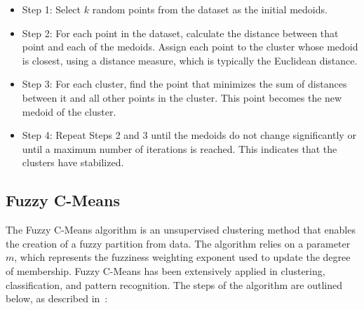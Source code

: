 \documentclass[a4paper,fleqn]{cas-dc}
\begin{document}
\begin{itemize}
    \item Step 1: Select \( k \) random points from the dataset as the initial medoids.

    \item Step 2: For each point in the dataset, calculate the distance between that point and each of the medoids. Assign each point to the cluster whose medoid is closest, using a distance measure, which is typically the Euclidean distance.

    \item Step 3: For each cluster, find the point that minimizes the sum of distances between it and all other points in the cluster. This point becomes the new medoid of the cluster.

    \item Step 4: Repeat Steps 2 and 3 until the medoids do not change significantly or until a maximum number of iterations is reached. This indicates that the clusters have stabilized.
\end{itemize}

\subsection{Fuzzy C-Means}

The Fuzzy C-Means algorithm is an unsupervised clustering method that enables the creation of a fuzzy partition from data. The algorithm relies on a parameter \( m \), which represents the fuzziness weighting exponent used to update the degree of membership. Fuzzy C-Means has been extensively applied in clustering, classification, and pattern recognition. The steps of the algorithm are outlined below, as described in~\cite{oyewole2023data}:
\end{document}
